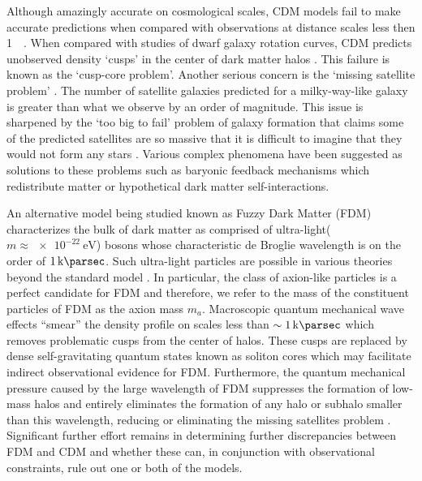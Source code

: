 \documentclass[usenatbib]{mnras}
\newcommand{\squote}[1]{\lq #1\rq}
\newcommand{\poweV}[1]{\SI{e#1}{\electronvolt}}
\begin{document}
\par

Although amazingly accurate on cosmological scales, CDM models fail to make accurate predictions when compared with observations at distance scales less then \SI{1}{\kilo\parsec}. When compared with studies of dwarf galaxy rotation curves, CDM predicts unobserved density \squote{cusps} in the center of dark matter halos \citep{ultralight}. This failure is known as the \squote{cusp-core problem}. Another serious concern is the \squote{missing satellite problem}  \citep{missing_satellites}. The number of satellite galaxies predicted for a milky-way-like galaxy is greater than what we observe by an order of magnitude. This issue is sharpened by the \squote{too big to fail} problem of galaxy formation that claims some of the predicted satellites are so massive that it is difficult to imagine that they would not form any stars \citep{too_big_to_fail}. Various complex phenomena have been suggested as solutions to these problems such as baryonic feedback mechanisms which redistribute matter or  hypothetical dark matter self-interactions.

\par

An alternative model being studied known as Fuzzy Dark Matter (FDM) characterizes the bulk of dark matter as comprised of ultra-light($m \approx \poweV{-22}$) bosons whose characteristic de Broglie wavelength is on the order of $\SI{1}{\kilo\parsec}$. Such ultra-light particles are possible in various theories beyond the standard model \citep{axion_cosmology}. In particular, the class of axion-like particles is a perfect candidate for FDM and therefore, we refer to the mass of the constituent particles of FDM as the axion mass $m_a$. Macroscopic quantum mechanical wave effects “smear” the density profile on scales less than $\sim \SI{1}{\kilo\parsec}$ which removes problematic cusps from the center of halos. These cusps are replaced by dense self-gravitating quantum states known as soliton cores which may facilitate indirect observational evidence for FDM. Furthermore, the quantum mechanical pressure caused by the large wavelength of FDM suppresses the formation of low-mass halos and entirely eliminates the formation of any halo or subhalo smaller than this wavelength, reducing or eliminating the missing satellites problem \citep{substructure_FDM}. Significant further effort remains in determining further discrepancies between FDM and CDM and whether these can, in conjunction with observational constraints, rule out one or both of the models.
 
\end{document}
